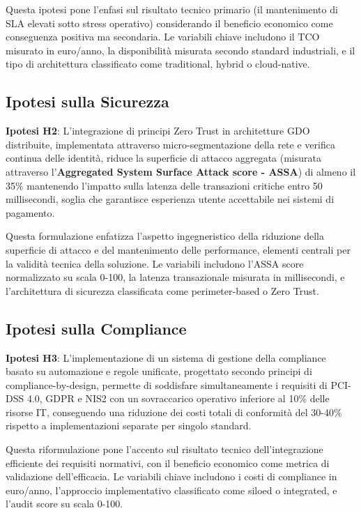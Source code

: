 \documentclass[12pt,a4paper,oneside]{book}
\numberwithin{figure}{chapter} %
\numberwithin{table}{chapter}  %
\begin{document}
Questa ipotesi pone l'enfasi sul risultato tecnico primario (il
mantenimento di SLA elevati sotto stress operativo) considerando il beneficio economico come conseguenza positiva ma secondaria. Le
variabili chiave includono il TCO misurato in euro/anno, la disponibilità misurata secondo standard industriali, e il tipo di architettura classificato come traditional, hybrid o cloud-native.

\subsection{\texorpdfstring{\textbf{Ipotesi sulla
Sicurezza}}{1.4.2 Ipotesi sulla Sicurezza}}\label{ipotesi-sulla-sicurezza}

\textbf{Ipotesi H2}: L'integrazione di principi Zero Trust in architetture GDO distribuite, implementata attraverso micro-segmentazione della rete e verifica continua delle identità, riduce la superficie di attacco aggregata (misurata attraverso l'\textbf{Aggregated System Surface Attack score - ASSA}) di almeno il 35\% mantenendo l'impatto sulla latenza delle transazioni critiche entro 50 millisecondi, soglia che garantisce esperienza utente accettabile nei sistemi di pagamento.

Questa formulazione enfatizza l'aspetto ingegneristico della riduzione della superficie di attacco e del mantenimento delle performance, elementi centrali per la validità tecnica della soluzione. Le variabili includono l'ASSA score normalizzato su scala 0-100, la latenza transazionale misurata in millisecondi, e l'architettura di sicurezza classificata come perimeter-based o Zero Trust.

\subsection{\texorpdfstring{\textbf{Ipotesi sulla
Compliance}}{1.4.3 Ipotesi sulla Compliance}}\label{ipotesi-sulla-compliance}

\textbf{Ipotesi H3}: L'implementazione di un sistema di gestione della compliance basato su automazione e regole unificate, progettato secondo principi di compliance-by-design, permette di soddisfare simultaneamente i requisiti di PCI-DSS 4.0, GDPR e NIS2 con un sovraccarico operativo inferiore al 10\% delle risorse IT, conseguendo una riduzione dei costi
totali di conformità del 30-40\% rispetto a implementazioni separate per singolo standard.

Questa riformulazione pone l'accento sul risultato tecnico
dell'integrazione efficiente dei requisiti normativi, con il beneficio economico come metrica di validazione dell'efficacia. Le variabili chiave includono i costi di compliance in euro/anno, l'approccio implementativo classificato come siloed o integrated, e l'audit score su scala 0-100.
\end{document}
